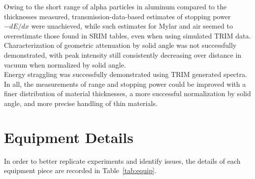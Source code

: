 \documentclass[12pt]{article}
\begin{document}
Owing to the short range of alpha particles in aluminum compared to the thicknesses measured, transmission-data-based estimates of stopping power $-dE/dx$ were unachieved, while such estimates for Mylar and air seemed to overestimate those found in SRIM tables, even when using simulated TRIM data.\\

Characterization of geometric attenuation by solid angle was not successfully demonstrated, with peak intensity still consistently decreasing over distance in vacuum when normalized by solid angle.\\

Energy straggling was successfully demonstrated using TRIM generated spectra.\\

In all, the measurements of range and stopping power could be improved with a finer distribution of material thicknesses, a more successful normalization by solid angle, and more precise handling of thin materials.

% 
\pagebreak\printbibliography

\appendix
\pagebreak
\FloatBarrier\section{Equipment Details}\label{app:equip}
In order to better replicate experiments and identify issues, the details of each equipment piece are recorded in Table~\ref{tab:equip}.
\end{document}
